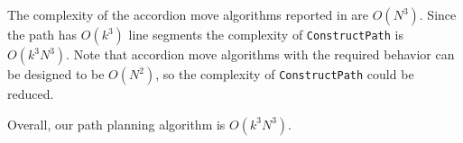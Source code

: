 \documentclass[twocolumn]{IEEEtran}
\begin{document}
The complexity of the accordion move algorithms reported in
\cite{TM02} are $O(N^3)$. Since the path has $O(k^3)$ line segments
the complexity of {\tt ConstructPath} is $O(k^3N^3)$.  Note that
accordion move algorithms with the required behavior can be designed
to be $O(N^2)$, so the complexity of {\tt ConstructPath} could be
reduced.

Overall, our path planning algorithm is  $O(k^3N^3)$.



\end{document}
